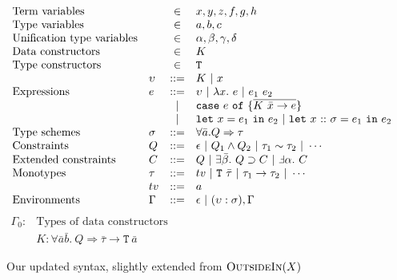 \documentclass[a4paper]{jfp}
\newcommand{\outsidein}{\textsc{OutsideIn}(X)}
\begin{document}
\begin{figure}
	\caption{Our updated syntax, slightly extended from $\outsidein$}
   	\begin{displaymath}
	\begin{array}{llcl}
		\text{Term variables} & & \in & x, y, z, f, g, h \\
		\text{Type variables} & & \in & a, b, c \\
		\text{Unification type variables} & & \in & \alpha, \beta, \gamma, \delta \\
		\text{Data constructors} & & \in & K \\
		\text{Type constructors} & & \in & {\tt T} \\
		& \upsilon & ::= & K\ |\ x \\
		\text{Expressions} & e & ::=  & \upsilon\ |\ \lambda x.\ e\ |\ e_1\ e_2\ \\
		                   &   & | & \mathtt{case}\ e\ \mathtt{of}\ \{\overline{K\ \bar{x} \rightarrow e} \} \\
		                   &   & | & \mathtt{let}\ x = e_1\ \mathtt{in}\ e_2\ |\ \mathtt{let}\ x\ \mathtt{::}\ \sigma = e_1\ \mathtt{in}\ e_2\\
		\text{Type schemes} & \sigma & ::= & \forall \bar{a}. Q \Rightarrow \tau \\
		\text{Constraints} & Q & ::= & \epsilon\ |\ Q_1 \land Q_2\ |\ \tau_1 \sim \tau_2\ |\ \cdots  \\
		\text{Extended constraints} & C & ::= & Q\ |\ \exists \bar{\beta}.\ Q \supset C\ |\ \Finv \alpha.\ C \\
		\text{Monotypes} & \tau & ::= & tv\ |\ \mathtt{T}\ \bar{\tau}\ |\ \tau_1 \rightarrow \tau_2\ |\ \cdots \\
		 & tv & ::= & a \\
		\text{Environments} & \Gamma & ::= & \epsilon\ |\ (\upsilon : \sigma), \Gamma \\
	\end{array}	
	\end{displaymath}
	\begin{math}
		\begin{array}{ll}
		\Gamma_0: &  \text{Types of data constructors} \\
		& K : \forall\bar{a}\bar{b}.\ Q \Rightarrow \bar{\tau} \rightarrow \mathtt{T}\ \bar{a}
		\end{array}
		\end{math}
\end{figure}
\end{document}
